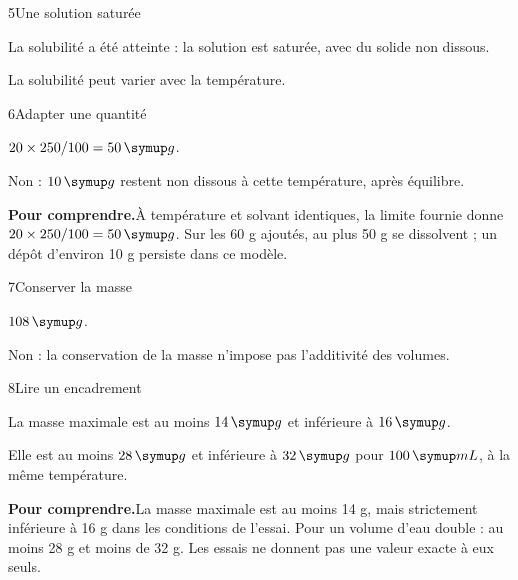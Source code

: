 \par\noindent\begin{minipage}{\linewidth}
\begin{corrige}{5}{Une solution saturée}
\begin{questions}
\item La solubilité a été atteinte : la solution est saturée, avec du solide non dissous.
\item La solubilité peut varier avec la température.
\end{questions}
\end{corrige}
\end{minipage}
\par\noindent\begin{minipage}{\linewidth}
\begin{corrige}{6}{Adapter une quantité}
\begin{questions}
\item $20\times250/100=50\unite g$.
\item Non : $10\unite g$ restent non dissous à cette température, après équilibre.
\end{questions}
\par\smallskip\noindent\textbf{Pour comprendre.}\enspace À température et solvant identiques, la limite fournie donne $20\times250/100=50\unite g$. Sur les 60 g ajoutés, au plus 50 g se dissolvent ; un dépôt d’environ 10 g persiste dans ce modèle.\par
\end{corrige}
\end{minipage}
\par\noindent\begin{minipage}{\linewidth}
\begin{corrige}{7}{Conserver la masse}
\begin{questions}
\item $108\unite g$.
\item Non : la conservation de la masse n’impose pas l’additivité des volumes.
\end{questions}
\end{corrige}
\end{minipage}
\par\noindent\begin{minipage}{\linewidth}
\begin{corrige}{8}{Lire un encadrement}
\begin{questions}
\item La masse maximale est au moins $14\unite g$ et inférieure à $16\unite g$.
\item Elle est au moins $28\unite g$ et inférieure à $32\unite g$ pour $100\unite{mL}$, à la même température.
\end{questions}
\par\smallskip\noindent\textbf{Pour comprendre.}\enspace La masse maximale est au moins 14 g, mais strictement inférieure à 16 g dans les conditions de l’essai. Pour un volume d’eau double : au moins 28 g et moins de 32 g. Les essais ne donnent pas une valeur exacte à eux seuls.\par
\end{corrige}
\end{minipage}
